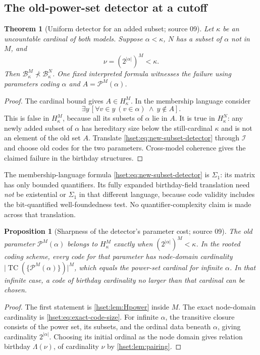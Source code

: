 \documentclass[11pt,letterpaper]{article}
\newtheorem{theorem}{Theorem}[section]
\newtheorem{proposition}[proposition]{Proposition}\aliascntresetthe{proposition}
\theoremstyle{definition}
\theoremstyle{remark}
\newcommand{\TC}{\operatorname{TC}}
\newcommand{\B}{\mathcal B}
\newcommand{\I}{\mathcal I}
\newcommand{\Pow}{\mathcal P}
\newcommand{\card}[1]{\lvert#1\rvert}
\begin{document}
\subsection{The old-power-set detector at a cutoff}

\begin{theorem}[Uniform detector for an added subset; source 09]
\label{hset:thm:detector}
Let $\kappa$ be an uncountable cardinal of both models. Suppose $\alpha<\kappa$,
$N$ has a subset of $\alpha$ not in $M$, and
\[
 \nu=(2^{\card\alpha})^M<\kappa.
\]
Then $\B_\kappa^M\not\prec\B_\kappa^N$. One fixed interpreted formula
witnesses the failure using parameters coding $\alpha$ and
$A=\Pow^M(\alpha)$.
\end{theorem}
\begin{proof}
The cardinal bound gives $A\in H_\kappa^M$. In the membership language
consider
\begin{equation}
 \exists y\,[\forall v\in y\ (v\in\alpha)\ \land\ y\notin A].
 \label{hset:eq:new-subset-detector}
\end{equation}
This is false in $H_\kappa^M$, because all its subsets of $\alpha$ lie in
$A$. It is true in $H_\kappa^N$: any newly added subset of $\alpha$ has
hereditary size below the still-cardinal $\kappa$ and is not an element of
the old set $A$. Translate \eqref{hset:eq:new-subset-detector} through $\I$ and
choose old codes for the two parameters. Cross-model coherence gives the
claimed failure in the birthday structures.
\end{proof}

The membership-language formula \eqref{hset:eq:new-subset-detector} is
$\Sigma_1$: its matrix has only bounded quantifiers. Its fully expanded
birthday-field translation need \emph{not} be existential or $\Sigma_1$ in
that different language, because code validity includes the bit-quantified
well-foundedness test. No quantifier-complexity claim is made across that
translation.

\begin{proposition}[Sharpness of the detector's parameter cost; source 09]
\label{hset:prop:detector-cost}
The old parameter $\Pow^M(\alpha)$ belongs to $H_\kappa^M$ exactly when
$(2^{\card\alpha})^M<\kappa$. In the rooted coding scheme, every code for
that parameter has node-domain cardinality
$\card{\TC(\{\Pow^M(\alpha)\})}^M$, which equals the power-set cardinal for
infinite $\alpha$. In that infinite case, a code of birthday cardinality no
larger than that cardinal can be chosen.
\end{proposition}
\begin{proof}
The first statement is \cref{hset:lem:Hpower} inside $M$. The exact
node-domain cardinality is \eqref{hset:eq:exact-code-size}. For infinite
$\alpha$, the transitive closure consists of the power set, its subsets,
and the ordinal data beneath $\alpha$, giving cardinality
$2^{\card\alpha}$. Choosing its initial ordinal as the node domain gives
relation birthday $\Lambda(\nu)$, of cardinality $\nu$ by
\cref{hset:lem:pairing}.
\end{proof}
\end{document}
